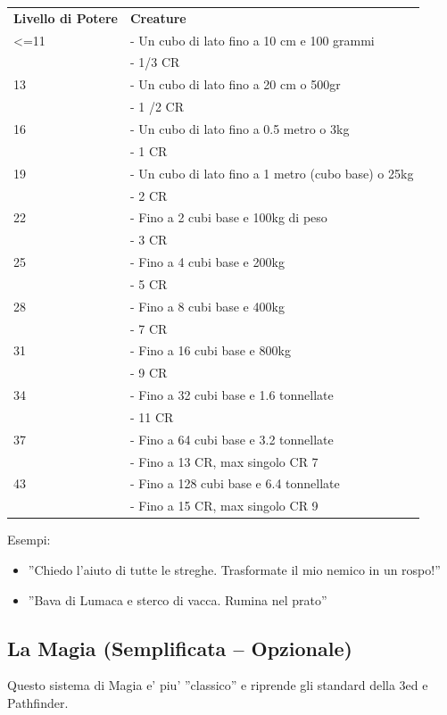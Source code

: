 \documentclass[a4paper,11pt,twoside,openany]{book}
\begin{document}
\bigskip

\begin{tabular}{L{3cm} L{10cm}}
\toprule
\textbf{Livello di Potere} & \textbf{Creature}\tabularnewline
<=11& - Un cubo di lato fino a 10 cm e 100 grammi\\
&- 1/3 CR\\
13& - Un cubo di lato fino a 20 cm o 500gr\\
&- 1 /2 CR\\
16& - Un cubo di lato fino a 0.5 metro o 3kg\\
&- 1 CR\\
19& - Un cubo di lato fino a 1 metro (cubo base) o 25kg\\
&- 2 CR\\
22& - Fino a 2 cubi base e 100kg di peso\\
&- 3 CR\\
25& - Fino a 4 cubi base e 200kg\\
&- 5 CR\\
28& - Fino a 8 cubi base e 400kg\\
&- 7 CR\\
31& - Fino a 16 cubi base e 800kg\\
&- 9 CR\\
34& - Fino a 32 cubi base e 1.6 tonnellate\\
&- 11 CR\\
37& - Fino a 64 cubi base e 3.2 tonnellate\\
&- Fino a 13 CR, max singolo CR 7\\
43& - Fino a 128 cubi base e 6.4 tonnellate\\
&- Fino a 15 CR, max singolo CR 9\\
\end{tabular}

\bigskip


Esempi:
\begin{itemize}
\item 
''Chiedo l'aiuto di tutte le streghe. Trasformate il mio nemico in un rospo!'' 
\item 
''Bava di Lumaca e sterco di vacca. Rumina nel prato'' 
\end{itemize}

\pagebreak

\subsection{La Magia (Semplificata -- Opzionale)}


Questo sistema di Magia e' piu' ''classico'' e riprende gli standard della 3ed e Pathfinder.
\end{document}
